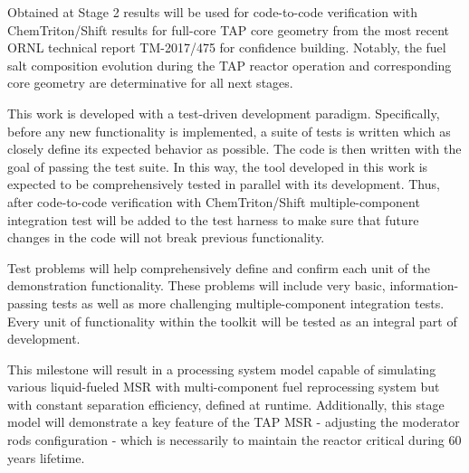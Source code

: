 Obtained at Stage 2 results will be used for code-to-code verification with  
ChemTriton/Shift results for full-core \gls{TAP} core geometry from the most 
recent \gls{ORNL} technical report TM-2017/475 \cite{betzler_assessment_2017} 
for confidence building. Notably, the fuel salt composition evolution during 
the \gls{TAP} reactor operation and corresponding core geometry are 
determinative for all next stages.

This work is developed with a test-driven development paradigm. Specifically, 
before any new functionality is implemented, a suite of tests is written which 
as closely define its expected behavior as possible. The code is then written 
with the goal of passing the test suite. In this way, the tool developed in 
this work is expected to be comprehensively tested in parallel with its 
development. Thus, after code-to-code verification with ChemTriton/Shift 
multiple-component integration test will be added to the test harness to make 
sure that future changes in the code will not break previous functionality.

Test problems will help comprehensively define and confirm each unit of the 
demonstration functionality. These problems will include very basic, 
information-passing tests as well as more challenging multiple-component 
integration tests. Every unit of functionality within the toolkit will be 
tested as an integral part of development.

This milestone will result in a processing system model capable of simulating
various liquid-fueled \gls{MSR} with multi-component fuel reprocessing system 
but with constant separation efficiency, defined at runtime. Additionally, 
this stage model will demonstrate a key feature of the \gls{TAP} \gls{MSR} - 
adjusting the moderator rods configuration - which is necessarily to maintain 
the reactor critical during 60 years lifetime. 

